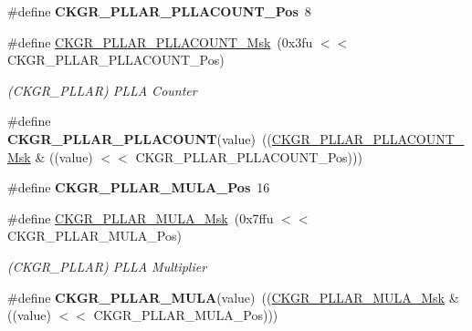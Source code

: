 \begin{DoxyCompactItemize}
\#define {\bfseries C\+K\+G\+R\+\_\+\+P\+L\+L\+A\+R\+\_\+\+P\+L\+L\+A\+C\+O\+U\+N\+T\+\_\+\+Pos}~8
\item 
\mbox{\label{group__SAMV71__PMC_ga1f07433c2360f33bb966516a27e485f1}} 
\#define \mbox{\hyperlink{group__SAMV71__PMC_ga1f07433c2360f33bb966516a27e485f1}{C\+K\+G\+R\+\_\+\+P\+L\+L\+A\+R\+\_\+\+P\+L\+L\+A\+C\+O\+U\+N\+T\+\_\+\+Msk}}~(0x3fu $<$$<$ C\+K\+G\+R\+\_\+\+P\+L\+L\+A\+R\+\_\+\+P\+L\+L\+A\+C\+O\+U\+N\+T\+\_\+\+Pos)
\begin{DoxyCompactList}\small\item\em (C\+K\+G\+R\+\_\+\+P\+L\+L\+AR) P\+L\+LA Counter \end{DoxyCompactList}\item 
\mbox{\label{group__SAMV71__PMC_ga3d075b69defd1b528e1530c80b57172b}} 
\#define {\bfseries C\+K\+G\+R\+\_\+\+P\+L\+L\+A\+R\+\_\+\+P\+L\+L\+A\+C\+O\+U\+NT}(value)~((\mbox{\hyperlink{group__SAMV71__PMC_ga1f07433c2360f33bb966516a27e485f1}{C\+K\+G\+R\+\_\+\+P\+L\+L\+A\+R\+\_\+\+P\+L\+L\+A\+C\+O\+U\+N\+T\+\_\+\+Msk}} \& ((value) $<$$<$ C\+K\+G\+R\+\_\+\+P\+L\+L\+A\+R\+\_\+\+P\+L\+L\+A\+C\+O\+U\+N\+T\+\_\+\+Pos)))
\item 
\mbox{\label{group__SAMV71__PMC_ga5435361dc5246da74e4019012ed9a474}} 
\#define {\bfseries C\+K\+G\+R\+\_\+\+P\+L\+L\+A\+R\+\_\+\+M\+U\+L\+A\+\_\+\+Pos}~16
\item 
\mbox{\label{group__SAMV71__PMC_gac720bcb52bfadc5d76f43d76acce85c7}} 
\#define \mbox{\hyperlink{group__SAMV71__PMC_gac720bcb52bfadc5d76f43d76acce85c7}{C\+K\+G\+R\+\_\+\+P\+L\+L\+A\+R\+\_\+\+M\+U\+L\+A\+\_\+\+Msk}}~(0x7ffu $<$$<$ C\+K\+G\+R\+\_\+\+P\+L\+L\+A\+R\+\_\+\+M\+U\+L\+A\+\_\+\+Pos)
\begin{DoxyCompactList}\small\item\em (C\+K\+G\+R\+\_\+\+P\+L\+L\+AR) P\+L\+LA Multiplier \end{DoxyCompactList}\item 
\mbox{\label{group__SAMV71__PMC_ga0784e6083209f155caeea714db658656}} 
\#define {\bfseries C\+K\+G\+R\+\_\+\+P\+L\+L\+A\+R\+\_\+\+M\+U\+LA}(value)~((\mbox{\hyperlink{group__SAMV71__PMC_gac720bcb52bfadc5d76f43d76acce85c7}{C\+K\+G\+R\+\_\+\+P\+L\+L\+A\+R\+\_\+\+M\+U\+L\+A\+\_\+\+Msk}} \& ((value) $<$$<$ C\+K\+G\+R\+\_\+\+P\+L\+L\+A\+R\+\_\+\+M\+U\+L\+A\+\_\+\+Pos)))

\end{DoxyCompactItemize}
